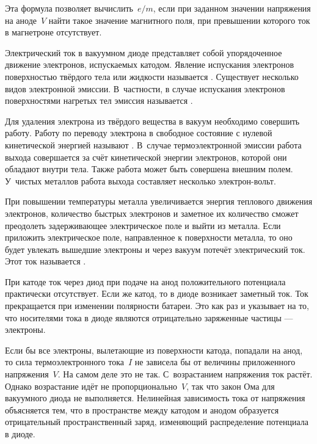 Эта формула позволяет вычислить~$e/m$, если при заданном значении напряжения на
аноде~$V$ найти такое значение
магнитного поля, при превышении которого ток в магнетроне отсутствует.
\todo[inline,color=cyan]{<---}



Электрический ток в вакуумном диоде представляет собой упорядоченное движение
электронов, испускаемых катодом. Явление испускания электронов поверхностью
твёрдого тела или жидкости называется .
Существует несколько видов электронной эмиссии. В~частности, в случае
испускания электронов поверхностями нагретых тел эмиссия называется
.

Для удаления электрона из твёрдого вещества в вакуум необходимо совершить работу.
Работу по переводу электрона в свободное состояние с нулевой кинетической
энергией называют . В~случае термоэлектронной эмиссии
работа выхода совершается за счёт кинетической энергии электронов,
которой они обладают внутри тела. Также работа может быть совершена внешним полем.
У~чистых металлов работа выхода составляет несколько электрон-вольт.

При повышении температуры металла увеличивается энергия теплового движения
электронов, количество быстрых электронов и заметное их количество сможет
преодолеть задерживающее электрическое поле и выйти из металла. Если приложить
электрическое поле, направленное к поверхности металла, то оно будет увлекать
вышедшие электроны и через вакуум потечёт электрический ток.
Этот ток называется .

При  катоде ток через диод при подаче на анод
положительного потенциала практически отсутствует. Если же 
катод, то в диоде возникает заметный ток. Ток прекращается при изменении
полярности батареи. Это как раз и указывает на то, что носителями тока в диоде
являются отрицательно заряженные частицы --- электроны.

Если бы все электроны, вылетающие из поверхности катода, попадали на анод, то
сила термоэлектронного тока~$I$ не зависела бы от величины приложенного
напряжения~$V$. На самом деле это не так. С~возрастанием напряжения ток растёт.
Однако возрастание идёт не пропорционально~$V$, так что закон Ома для вакуумного
диода не выполняется. Нелинейная зависимость тока от напряжения объясняется тем, что в пространстве
между катодом и анодом образуется отрицательный пространственный заряд,
изменяющий распределение потенциала в диоде.

